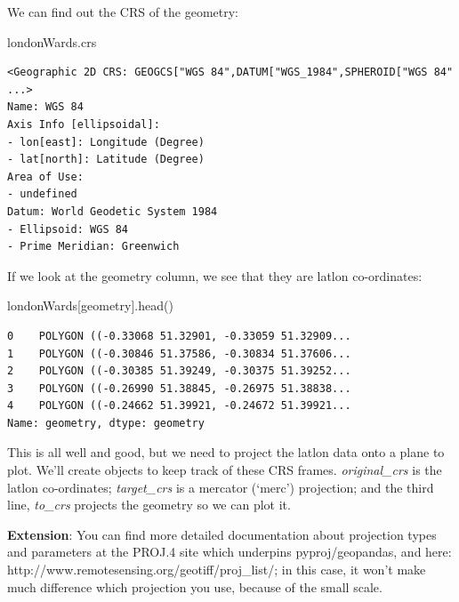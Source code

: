 \documentclass[
  letterpaper,
  DIV=11,
  numbers=noendperiod]{scrreprt}
\newenvironment{Shaded}{\begin{snugshade}}{\end{snugshade}}
\newcommand{\NormalTok}[1]{\textcolor[rgb]{0.00,0.23,0.31}{#1}}
\newcommand{\StringTok}[1]{\textcolor[rgb]{0.13,0.47,0.30}{#1}}
\begin{document}
We can find out the CRS of the geometry:

\begin{Shaded}
\begin{Highlighting}[]
\NormalTok{londonWards.crs}
\end{Highlighting}
\end{Shaded}

\begin{verbatim}
<Geographic 2D CRS: GEOGCS["WGS 84",DATUM["WGS_1984",SPHEROID["WGS 84" ...>
Name: WGS 84
Axis Info [ellipsoidal]:
- lon[east]: Longitude (Degree)
- lat[north]: Latitude (Degree)
Area of Use:
- undefined
Datum: World Geodetic System 1984
- Ellipsoid: WGS 84
- Prime Meridian: Greenwich
\end{verbatim}

If we look at the geometry column, we see that they are latlon
co-ordinates:

\begin{Shaded}
\begin{Highlighting}[]
\NormalTok{londonWards[}\StringTok{\textquotesingle{}geometry\textquotesingle{}}\NormalTok{].head()}
\end{Highlighting}
\end{Shaded}

\begin{verbatim}
0    POLYGON ((-0.33068 51.32901, -0.33059 51.32909...
1    POLYGON ((-0.30846 51.37586, -0.30834 51.37606...
2    POLYGON ((-0.30385 51.39249, -0.30375 51.39252...
3    POLYGON ((-0.26990 51.38845, -0.26975 51.38838...
4    POLYGON ((-0.24662 51.39921, -0.24672 51.39921...
Name: geometry, dtype: geometry
\end{verbatim}

This is all well and good, but we need to project the latlon data onto a
plane to plot. We'll create objects to keep track of these CRS frames.
\emph{original\_crs} is the latlon co-ordinates; \emph{target\_crs} is a
mercator (`merc') projection; and the third line, \emph{to\_crs}
projects the geometry so we can plot it.

\textbf{Extension}: You can find more detailed documentation about
projection types and parameters at the PROJ.4 site which underpins
pyproj/geopandas, and here:
http://www.remotesensing.org/geotiff/proj\_list/; in this case, it won't
make much difference which projection you use, because of the small
scale.
\end{document}
